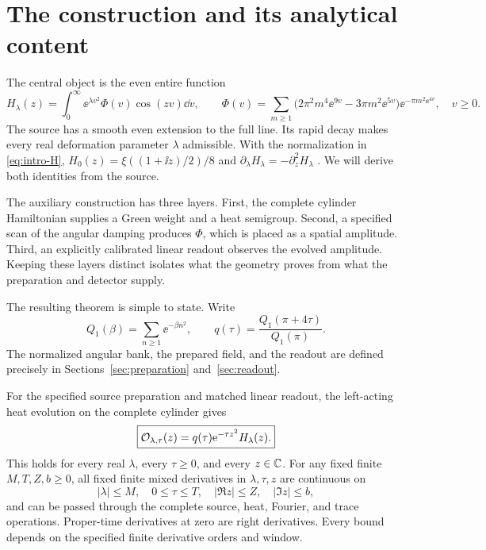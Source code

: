 \section{The construction and its analytical content}
\label{sec:overview}

The central object is the even entire function
\begin{equation}
 H_\lambda(z)=\int_0^\infty
 \ee^{\lambda v^2}\Phi(v)\cos(zv)\dd v,
 \qquad
 \Phi(v)=\sum_{m\ge1}
 \bigl(2\pi^2m^4\ee^{9v}-3\pi m^2\ee^{5v}\bigr)
 \ee^{-\pi m^2\ee^{4v}},\quad v\ge0.
 \label{eq:intro-H}
\end{equation}
The source has a smooth even extension to the full line. Its rapid decay
makes every real deformation parameter $\lambda$ admissible. With the
normalization in \eqref{eq:intro-H},
$H_0(z)=\xi((1+\ii z)/2)/8$ and
$\partial_\lambda H_\lambda=-\partial_z^2H_\lambda$
\cite{RodgersTao2020}. We will derive both identities from the source.

The auxiliary construction has three layers. First, the complete cylinder
Hamiltonian supplies a Green weight and a heat semigroup. Second, a
specified scan of the angular damping produces $\Phi$, which is placed
as a spatial amplitude. Third, an explicitly calibrated linear readout
observes the evolved amplitude. Keeping these layers distinct isolates
what the geometry proves from what the preparation and detector supply.

The resulting theorem is simple to state. Write
\begin{equation}
 Q_1(\beta)=\sum_{n\ge1}\ee^{-\beta n^2},\qquad
 q(\tau)=\frac{Q_1(\pi+4\tau)}{Q_1(\pi)}.
 \label{eq:intro-q}
\end{equation}
The normalized angular bank, the prepared field, and the readout are
defined precisely in Sections~\ref{sec:preparation} and~\ref{sec:readout}.

\begin{theorem}
\label{thm:overview}
For the specified source preparation and matched linear readout, the
left-acting heat evolution on the complete cylinder gives
\begin{equation}
 \boxed{\mathcal O_{\lambda,\tau}(z)
       =q(\tau)\mathrm e^{-\tau z^2}H_\lambda(z).}
 \label{eq:response-overview}
\end{equation}
This holds for every real $\lambda$, every $\tau\ge0$, and every $z\in\mathbb C$.
For any fixed finite $M,T,Z,b\ge0$, all fixed finite mixed derivatives
in $\lambda,\tau,z$ are continuous on
\begin{equation}
 |\lambda|\le M,\quad 0\le\tau\le T,\quad
 |\Re z|\le Z,\quad |\Im z|\le b,
 \label{eq:windows}
\end{equation}
and can be passed through the complete source, heat, Fourier, and trace
operations. Proper-time derivatives at zero are right derivatives.
Every bound depends on the specified finite derivative orders and window.
\end{theorem}

